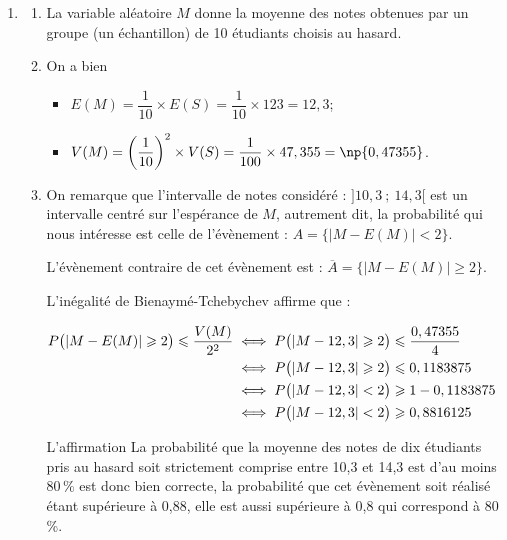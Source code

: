 \begin{enumerate}
$S$ étant la somme de ces dix variables aléatoires, on a :

	\begin{itemize}
		\item $E(S) = E(N_1) + E(N_2) + \dots + E(N_{10}) = 12,3 + 12,3 + ... + 12,3 = 123$;
		\item comme les variables aléatoires sont indépendantes,

		$V(S) =  V(N_1) + V(N_2) + \dots + V(N_{10}) = 10 \times 4,7355 = 47,355$	.
\end{itemize}

	\item
	\begin{enumerate}
		\item  La variable aléatoire $M$ donne la moyenne des notes obtenues par un groupe (un échantillon) de 10 étudiants choisis au hasard.

		\item On a bien
		\begin{itemize}
			\item $E(M)= \dfrac{1}{10}\times E(S) = \dfrac{1}{10}\times 123 = 12,3$;
			\item $V(M)=\left(\dfrac{1}{10}\right)^2\times V(S) = \dfrac{1}{100}\times 47,355 =  \np{0,47355}$.
		\end{itemize}
		\item On remarque que l'intervalle de notes considéré : $]10,3 ~;~ 14,3[$ est un intervalle centré sur l'espérance de $M$, autrement dit, la probabilité qui nous intéresse est celle de l'évènement :
		\quad $A = \big\{|M - E(M)| < 2\big\} $.

		L'évènement contraire de cet évènement est : 		\quad $\overline{A} = \big\{|M - E(M)| \geqslant 2\big\} $.

		L'inégalité de Bienaymé-Tchebychev affirme que :

		$\aligned[t] P\big( |M - E(M)| \geqslant 2 \big) \leqslant \dfrac{V(M)}{2^2 } &\iff P\big( |M -12,3| \geqslant 2 \big) \leqslant \dfrac{0,47355}{4}\\
		&\iff P\big( |M -12,3| \geqslant 2 \big) \leqslant 0,1183875 \\
		&\iff P\big( |M -12,3| <  2 \big) \geqslant 1 - 0,1183875\\
		&\iff P\big( |M -12,3| <  2 \big) \geqslant 0,8816125  \endaligned$

		L'affirmation \og La probabilité que la moyenne des notes de dix étudiants pris au hasard soit strictement comprise entre 10,3 et 14,3 est d'au moins $80\,\%$ \fg{} est donc bien correcte, la probabilité que cet évènement soit réalisé étant supérieure à 0,88, elle est aussi supérieure à 0,8 qui correspond à 80\,\%.
	\end{enumerate}
\end{enumerate}

\medskip

